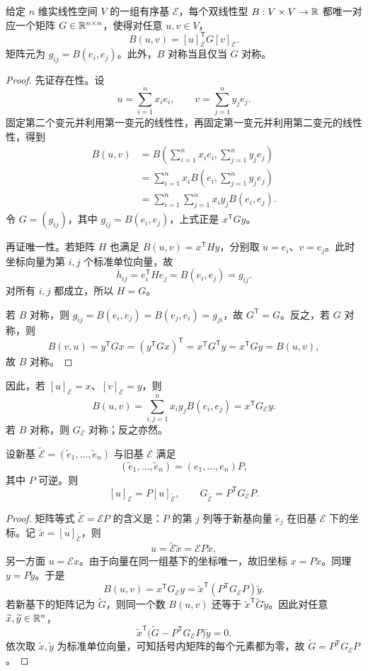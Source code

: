 \begin{theorem}[有限维双线性型的矩阵表示]
给定 $n$ 维实线性空间 $V$ 的一组有序基 $\mathcal E$，每个双线性型 $B:V\times V\to\mathbb{R}$ 都唯一对应一个矩阵 $G\in\mathbb{R}^{n\times n}$，使得对任意 $u,v\in V$，
\[
B(u,v)=[u]_{\mathcal E}^{\mathsf T}G[v]_{\mathcal E}.
\]
矩阵元为 $g_{ij}=B(e_i,e_j)$。此外，$B$ 对称当且仅当 $G$ 对称。
\end{theorem}
\begin{proof}
先证存在性。设
\[
u=\sum_{i=1}^n x_ie_i,\qquad v=\sum_{j=1}^n y_je_j.
\]
固定第二个变元并利用第一变元的线性性，再固定第一变元并利用第二变元的线性性，得到
\begin{align*}
B(u,v)
&=B\left(\sum_{i=1}^n x_ie_i,\sum_{j=1}^n y_je_j\right)\\
&=\sum_{i=1}^n x_iB\left(e_i,\sum_{j=1}^n y_je_j\right)\\
&=\sum_{i=1}^n\sum_{j=1}^n x_iy_jB(e_i,e_j).
\end{align*}
令 $G=(g_{ij})$，其中 $g_{ij}=B(e_i,e_j)$，上式正是 $x^{\mathsf T}Gy$。

再证唯一性。若矩阵 $H$ 也满足 $B(u,v)=x^{\mathsf T}Hy$，分别取 $u=e_i$、$v=e_j$。此时坐标向量为第 $i,j$ 个标准单位向量，故
\[
h_{ij}=e_i^{\mathsf T}He_j=B(e_i,e_j)=g_{ij}.
\]
对所有 $i,j$ 都成立，所以 $H=G$。

若 $B$ 对称，则 $g_{ij}=B(e_i,e_j)=B(e_j,e_i)=g_{ji}$，故 $G^{\mathsf T}=G$。反之，若 $G$ 对称，则
\[
B(v,u)=y^{\mathsf T}Gx=(y^{\mathsf T}Gx)^{\mathsf T}
=x^{\mathsf T}G^{\mathsf T}y=x^{\mathsf T}Gy=B(u,v),
\]
故 $B$ 对称。
\end{proof}

因此，若 $[u]_{\mathcal E}=x$、$[v]_{\mathcal E}=y$，则
\[
B(u,v)=\sum_{i,j=1}^n x_i y_j B(e_i,e_j)=x^{\mathsf T}G_{\mathcal E}y.
\]
若 $B$ 对称，则 $G_{\mathcal E}$ 对称；反之亦然。

\begin{theorem}[基变换下的矩阵变换]
设新基 $\widetilde{\mathcal E}=(\widetilde e_1,\ldots,\widetilde e_n)$ 与旧基 $\mathcal E$ 满足
\[
(\widetilde e_1,\ldots,\widetilde e_n)=(e_1,\ldots,e_n)P,
\]
其中 $P$ 可逆。则
\[
[u]_{\mathcal E}=P[u]_{\widetilde{\mathcal E}},\qquad
G_{\widetilde{\mathcal E}}=P^{\mathsf T}G_{\mathcal E}P.
\]
\end{theorem}
\begin{proof}
矩阵等式 $\widetilde{\mathcal E}=\mathcal E P$ 的含义是：$P$ 的第 $j$ 列等于新基向量 $\widetilde e_j$ 在旧基 $\mathcal E$ 下的坐标。记 $\widetilde x=[u]_{\widetilde{\mathcal E}}$，则
\[
u=\widetilde{\mathcal E}\widetilde x=\mathcal E P\widetilde x,
\]
另一方面 $u=\mathcal E x$。由于向量在同一组基下的坐标唯一，故旧坐标 $x=P\widetilde x$。同理 $y=P\widetilde y$。于是
\[
B(u,v)=x^{\mathsf T}G_{\mathcal E}y
=\widetilde x^{\mathsf T}(P^{\mathsf T}G_{\mathcal E}P)\widetilde y.
\]
若新基下的矩阵记为 $\widetilde G$，则同一个数 $B(u,v)$ 还等于 $\widetilde x^{\mathsf T}\widetilde G\widetilde y$。因此对任意 $\widetilde x,\widetilde y\in\mathbb{R}^n$，
\[
\widetilde x^{\mathsf T}\bigl(\widetilde G-P^{\mathsf T}G_{\mathcal E}P\bigr)\widetilde y=0.
\]
依次取 $\widetilde x,\widetilde y$ 为标准单位向量，可知括号内矩阵的每个元素都为零，故 $\widetilde G=P^{\mathsf T}G_{\mathcal E}P$。
\end{proof}

